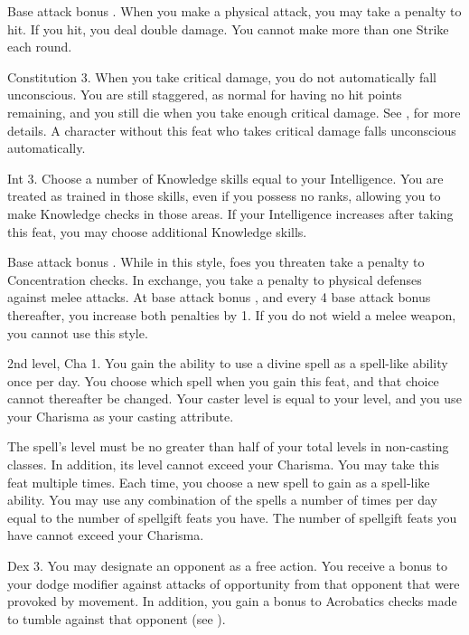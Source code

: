 \featpre Base attack bonus .
\featben When you make a physical attack, you may take a  penalty to hit. If you hit, you deal double damage. You cannot make more than one Strike each round.

 Constitution 3.
 When you take critical damage, you do not automatically fall unconscious. You are still staggered, as normal for having no hit points remaining, and you still die when you take enough critical damage. See , for more details.
 A character without this feat who takes critical damage falls unconscious automatically.

 Int 3.
 Choose a number of Knowledge skills equal to your Intelligence. You are treated as trained in those skills, even if you possess no ranks, allowing you to make Knowledge checks in those areas. If your Intelligence increases after taking this feat, you may choose additional Knowledge skills.

 Base attack bonus .
 While in this style, foes you threaten take a  penalty to Concentration checks. In exchange, you take a  penalty to physical defenses against melee attacks. At base attack bonus , and every 4 base attack bonus thereafter, you increase both penalties by 1. If you do not wield a melee weapon, you cannot use this style.

\featpre 2nd level, Cha 1.
\featben You gain the ability to use a divine spell as a spell-like ability once per day. You choose which spell when you gain this feat, and that choice cannot thereafter be changed. Your caster level is equal to your level, and you use your Charisma as your casting attribute.

The spell's level must be no greater than half of your total levels in non-casting classes. In addition, its level cannot exceed your Charisma.
 You may take this feat multiple times. Each time, you choose a new spell to gain as a spell-like ability. You may use any combination of the spells a number of times per day equal to the number of spellgift feats you have. The number of spellgift feats you have cannot exceed your Charisma.

 Dex 3.
 You may designate an opponent as a free action. You receive a  bonus to your dodge modifier against attacks of opportunity from that opponent that were provoked by movement. In addition, you gain a  bonus to Acrobatics checks made to tumble against that opponent (see ).

